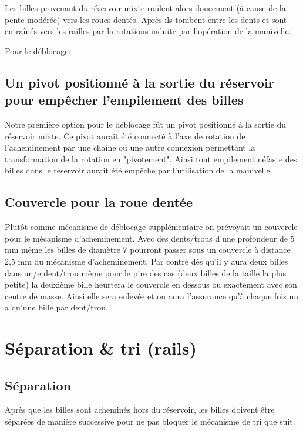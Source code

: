 Les billes provenant du réservoir mixte roulent alors doucement (à cause de la pente modérée)  vers les roues dentés. Après ils tombent entre les dents et sont entraînés vers les railles par la rotations induite par l'opération de la manivelle.


Pour le déblocage:
\subsection{Un pivot positionné à la sortie du réservoir pour empêcher l'empilement des billes} 
Notre première option pour le déblocage fût un pivot positionné à la sortie du réservoir mixte. Ce pivot aurait été connecté à l'axe de rotation de l'acheminement par une chaîne ou une autre connexion permettant la transformation de la rotation en "pivotement". Ainsi tout empilement néfaste des billes dans le réservoir aurait été empêche par l'utilisation de la manivelle.


\subsection{Couvercle pour la roue dentée}
Plutôt comme mécanisme de déblocage supplémentaire on prévoyait un couvercle pour le mécanisme d'acheminement. Avec des dents/trous d'une profondeur de 5 mm même les billes de diamètre 7 pourront passer sous un couvercle à distance 2,5 mm du mécanisme d'acheminement. Par contre dès qu'il y aura deux billes dans un/e dent/trou même pour le pire des cas (deux billes de la taille la plus petite) la deuxième bille heurtera le couvercle en dessous ou exactement avec son centre de masse. Ainsi elle sera enlevée et on aura l'assurance qu'à chaque fois un a qu'une bille par dent/trou.


\section{Séparation \& tri (rails)}

\subsection{Séparation}
Après que les billes sont acheminés hors du réservoir, les billes doivent être séparées de manière successive pour ne pas bloquer le mécanisme de tri que suit.

